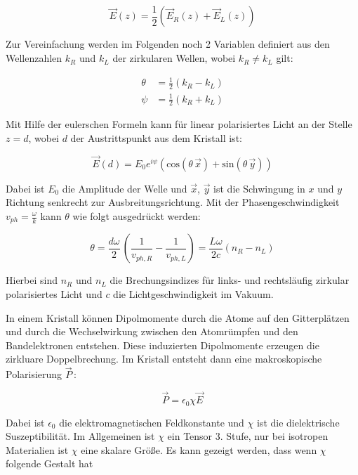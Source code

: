 \begin{equation}
    \vec{E} (z) = \frac{1}{2} \left( \vec{E}_R (z) + \vec{E}_L (z) \right)
    \label{eqn:zirk}
\end{equation}

Zur Vereinfachung werden im Folgenden noch 2 Variablen definiert aus den Wellenzahlen $k_R$ und $k_L$ der zirkularen Wellen, wobei $k_R \neq k_L$ gilt:

\begin{align*}
    \theta &= \frac{1}{2} \left( k_R - k_L \right) \\
    \psi &= \frac{1}{2} \left( k_R + k_L \right)
\end{align*}

Mit Hilfe der eulerschen Formeln kann für linear polarisiertes Licht an der Stelle $z=d$, wobei $d$ der Austrittspunkt aus dem Kristall ist:

\begin{equation}
    \vec{E} (d) =  E_0 e^{i \psi} \left( \text{cos} \left( \theta \, \vec{x} \right) + \text{sin} \left( \theta \, \vec{y} \right) \right)
\end{equation}

Dabei ist $E_0$ die Amplitude der Welle und $\vec{x}$, $\vec{y}$ ist die Schwingung in $x$ und $y$ Richtung senkrecht zur Ausbreitungsrichtung.
Mit der Phasengeschwindigkeit $v_{ph} = \frac{\omega}{k}$ kann $\theta$ wie folgt ausgedrückt werden:

\begin{equation}
    \theta = \frac{d \omega}{2} \, \left( \frac{1}{v_{ph,R}} - \frac{1}{v_{ph,L}} \right) = \frac{L \omega}{2 c} (n_R - n_L)
    \label{eqn:theta}
\end{equation}

Hierbei sind $n_R$ und $n_L$ die Brechungsindizes für links- und rechtsläufig zirkular polarisiertes Licht und $c$ die Lichtgeschwindigkeit im Vakuum.

In einem Kristall können Dipolmomente durch die Atome auf den Gitterplätzen und durch die Wechselwirkung zwischen den Atomrümpfen und den Bandelektronen entstehen. Diese induzierten Dipolmomente erzeugen die zirkluare Doppelbrechung. Im Kristall entsteht dann eine makroskopische Polarisierung $\vec{P} \,$:

\begin{equation}
    \vec{P} = \epsilon_0 \chi \vec{E}
    \label{eqn:P}
\end{equation}

Dabei ist $\epsilon_0$ die elektromagnetischen Feldkonstante und $\chi$ ist die dielektrische Suszeptibilität. Im Allgemeinen ist $\chi$ ein Tensor 3. Stufe, nur bei isotropen Materialien ist $\chi$ eine skalare Größe. Es kann gezeigt werden, dass wenn $\chi$ folgende Gestalt hat

